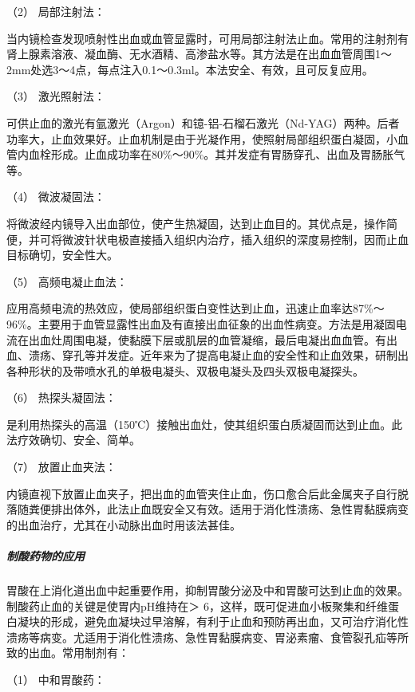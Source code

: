 \hypertarget{text00032.htmlux5cux23CHP1-13-1-5-3-1-2}{}
（2） 局部注射法：

当内镜检查发现喷射性出血或血管显露时，可用局部注射法止血。常用的注射剂有肾上腺素溶液、凝血酶、无水酒精、高渗盐水等。其方法是在出血血管周围1～2mm处选3～4点，每点注入0.1～0.3ml。本法安全、有效，且可反复应用。

\hypertarget{text00032.htmlux5cux23CHP1-13-1-5-3-1-3}{}
（3） 激光照射法：

可供止血的激光有氩激光（Argon）和镱-铝-石榴石激光（Nd-YAG）两种。后者功率大，止血效果好。止血机制是由于光凝作用，使照射局部组织蛋白凝固，小血管内血栓形成。止血成功率在80\%～90\%。其并发症有胃肠穿孔、出血及胃肠胀气等。

\hypertarget{text00032.htmlux5cux23CHP1-13-1-5-3-1-4}{}
（4） 微波凝固法：

将微波经内镜导入出血部位，使产生热凝固，达到止血目的。其优点是，操作简便，并可将微波针状电极直接插入组织内治疗，插入组织的深度易控制，因而止血目标确切，安全性大。

\hypertarget{text00032.htmlux5cux23CHP1-13-1-5-3-1-5}{}
（5） 高频电凝止血法：

应用高频电流的热效应，使局部组织蛋白变性达到止血，迅速止血率达87\%～96\%。主要用于血管显露性出血及有直接出血征象的出血性病变。方法是用凝固电流在出血灶周围电凝，使黏膜下层或肌层的血管凝缩，最后电凝出血血管。有出血、溃疡、穿孔等并发症。近年来为了提高电凝止血的安全性和止血效果，研制出各种形状的及带喷水孔的单极电凝头、双极电凝头及四头双极电凝探头。

\hypertarget{text00032.htmlux5cux23CHP1-13-1-5-3-1-6}{}
（6） 热探头凝固法：

是利用热探头的高温（150℃）接触出血灶，使其组织蛋白质凝固而达到止血。此法疗效确切、安全、简单。

\hypertarget{text00032.htmlux5cux23CHP1-13-1-5-3-1-7}{}
（7） 放置止血夹法：

内镜直视下放置止血夹子，把出血的血管夹住止血，伤口愈合后此金属夹子自行脱落随粪便排出体外，此法止血既安全又有效。适用于消化性溃疡、急性胃黏膜病变的出血治疗，尤其在小动脉出血时用该法甚佳。

\subparagraph{制酸药物的应用}

胃酸在上消化道出血中起重要作用，抑制胃酸分泌及中和胃酸可达到止血的效果。制酸药止血的关键是使胃内pH维持在＞
6，这样，既可促进血小板聚集和纤维蛋白凝块的形成，避免血凝块过早溶解，有利于止血和预防再出血，又可治疗消化性溃疡等病变。尤适用于消化性溃疡、急性胃黏膜病变、胃泌素瘤、食管裂孔疝等所致的出血。常用制剂有：

\hypertarget{text00032.htmlux5cux23CHP1-13-1-5-3-2-1}{}
（1） 中和胃酸药：


